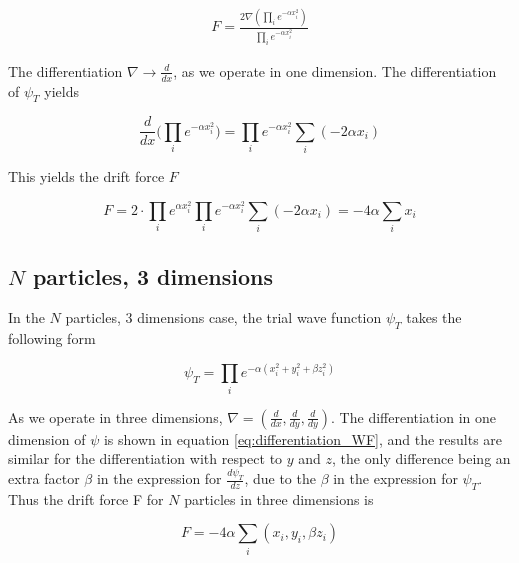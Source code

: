 \documentclass[norsk,a4paper,12pt]{article}
\begin{document}
\begin{align}
	F = \frac{2 \nabla ( \prod_i e^{-\alpha x_i^2} )}{ \prod_i e^{-\alpha x_i^2} }
\end{align}

The differentiation $\nabla \rightarrow \frac{d }{d x}$, as we operate in one dimension. The differentiation of $\psi_T$ yields

\begin{equation}
	\label{eq:differentiation_WF}
	\frac{d}{d x} \Big( \prod_i e^{-\alpha x_i^2}\Big) =  \prod_i e^{-\alpha x_i^2} \sum_i (-2\alpha x_i)
\end{equation}

This yields the drift force $F$

\begin{equation}
	F =  2\cdot \prod_i e^{\alpha x_i^2}   \prod_i e^{-\alpha x_i^2} \sum_i (-2\alpha x_i) = - 4 \alpha \sum_i x_i
\end{equation}

\subsection{$N$ particles, 3 dimensions}

In the $N$ particles, $3$ dimensions case, the trial wave function $\psi_T$ takes the following form

\begin{equation}
	\psi_T = \prod_i e^{- \alpha (x_i^2 + y_i^2 + \beta z_i^2)} 
\end{equation}

As we operate in three dimensions, $\nabla = (\frac{d}{dx}, \frac{d}{dy}, \frac{d}{dy})$. The differentiation in one dimension of $\psi$ is shown in equation \ref{eq:differentiation_WF}, and the results are similar for the differentiation with respect to $y$ and $z$, the only difference being an extra factor $\beta$ in the expression for $\frac{d \psi_T}{d z}$, due to the $\beta$ in the expression for $\psi_T$. Thus the drift force F for $N$ particles in three dimensions is 

\begin{equation}
	F = -4 \alpha \sum_i(x_i,y_i,\beta z_i)
\end{equation}
\end{document}
